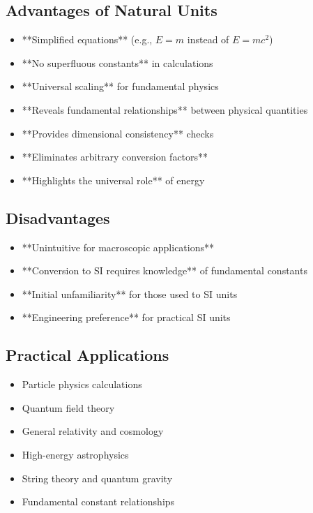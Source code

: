 	\subsection{Advantages of Natural Units}
	\begin{itemize}
		\item **Simplified equations** (e.g., $E = m$ instead of $E = mc^2$)
		\item **No superfluous constants** in calculations
		\item **Universal scaling** for fundamental physics
		\item **Reveals fundamental relationships** between physical quantities
		\item **Provides dimensional consistency** checks
		\item **Eliminates arbitrary conversion factors**
		\item **Highlights the universal role** of energy
	\end{itemize}
	
	\subsection{Disadvantages}
	\begin{itemize}
		\item **Unintuitive for macroscopic applications**
		\item **Conversion to SI requires knowledge** of fundamental constants
		\item **Initial unfamiliarity** for those used to SI units
		\item **Engineering preference** for practical SI units
	\end{itemize}
	
	\subsection{Practical Applications}
	\begin{itemize}
		\item Particle physics calculations
		\item Quantum field theory
		\item General relativity and cosmology
		\item High-energy astrophysics
		\item String theory and quantum gravity
		\item Fundamental constant relationships
	\end{itemize}
	
